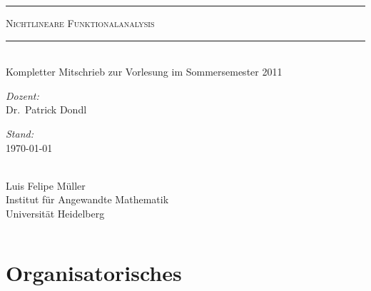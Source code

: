 \documentclass[14pt]{book}
\theoremstyle{plain}
\theoremstyle{nonumberplain}
\numberwithin{equation}{section}
\begin{document}
\begin{titlepage}
\[ \]
\begin{center}

\hrule\hspace*{1cm\\[3mm]}

\textsc{\Huge Nichtlineare Funktionalanalysis }\\[1cm]
\hrule \hspace*{1cm}\\[3mm]
{\sc Kompletter Mitschrieb zur Vorlesung im Sommersemester 2011}\\[0.5cm]
    \vspace{1cm}
\begin{minipage}{0.4\textwidth}
\begin{flushleft} \large
\emph{Dozent:}\\
    Dr.~Patrick Dondl
\end{flushleft}
\end{minipage}
\begin{minipage}{0.4\textwidth}
\begin{flushright} \large
\emph{Stand:} \\
    \today
\end{flushright}
\end{minipage}
\[ \]\\[1cm]
Luis Felipe Müller\\[1.5cm]
Institut für Angewandte Mathematik\\
Universität Heidelberg
     
\end{center}
\vfill

\end{titlepage}

\newpage \[ \]
\newpage
{}

\section*{Organisatorisches}
\end{document}
